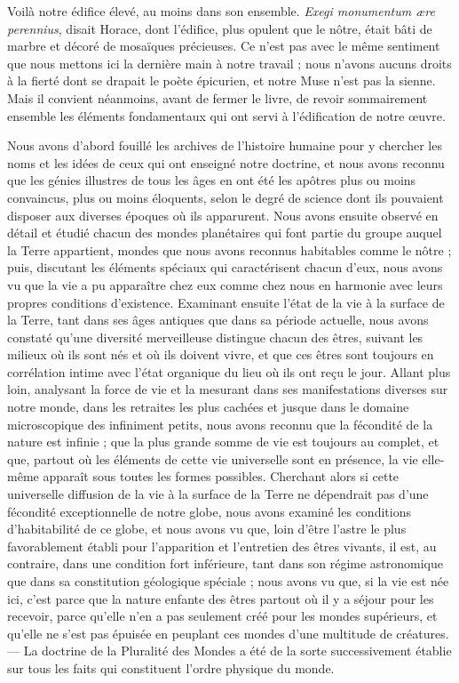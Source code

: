 \documentclass[a4paper, 11pt, oneside]{article}
\begin{document}
Voilà notre édifice élevé, au moins dans son ensemble. \emph{Exegi monumentum ære perennius}, disait Horace, dont l'édifice, plus opulent que le nôtre, était bâti de marbre et décoré de mosaïques précieuses. Ce n'est pas avec le même sentiment que nous mettons ici la dernière main à notre travail ; nous n'avons aucuns droits à la fierté dont se drapait le poète épicurien, et notre Muse n'est pas la sienne. Mais il convient néanmoins, avant de fermer le livre, de revoir sommairement ensemble les éléments fondamentaux qui ont servi à l'édification de notre œuvre.

Nous avons d'abord fouillé les archives de l'histoire humaine pour y chercher les noms et les idées de ceux qui ont enseigné notre doctrine, et nous avons reconnu que les génies illustres de tous les âges en ont été les apôtres plus ou moins convaincus, plus ou moins éloquents, selon le degré de science dont ils pouvaient disposer aux diverses époques où ils apparurent. Nous avons ensuite observé en détail et étudié chacun des mondes planétaires qui font partie du groupe auquel la Terre appartient, mondes que nous avons reconnus habitables comme le nôtre ; puis, discutant les éléments spéciaux qui caractérisent chacun d'eux, nous avons vu que la vie a pu apparaître chez eux comme chez nous en harmonie avec leurs propres conditions d'existence. Examinant ensuite l'état de la vie à la surface de la Terre, tant dans ses âges antiques que dans sa période actuelle, nous avons constaté qu'une diversité merveilleuse distingue chacun des êtres, suivant les milieux où ils sont nés et où ils doivent vivre, et que ces êtres sont toujours en corrélation intime avec l'état organique du lieu où ils ont reçu le jour. Allant plus loin, analysant la force de vie et la mesurant dans ses manifestations diverses sur notre monde, dans les retraites les plus cachées et jusque dans le domaine microscopique des infiniment petits, nous avons reconnu que la fécondité de la nature est infinie ; que la plus grande somme de vie est toujours au complet, et que, partout où les éléments de cette vie universelle sont en présence, la vie elle-même apparaît sous toutes les formes possibles. Cherchant alors si cette universelle diffusion de la vie à la surface de la Terre ne dépendrait pas d'une fécondité exceptionnelle de notre globe, nous avons examiné les conditions d'habitabilité de ce globe, et nous avons vu que, loin d'être l'astre le plus favorablement établi pour l'apparition et l'entretien des êtres vivants, il est, au contraire, dans une condition fort inférieure, tant dans son régime astronomique que dans sa constitution géologique spéciale ; nous avons vu que, si la vie est née ici, c'est parce que la nature enfante des êtres partout où il y a séjour pour les recevoir, parce qu'elle n'en a pas seulement créé pour les mondes supérieurs, et qu'elle ne s'est pas épuisée en peuplant ces mondes d'une multitude de créatures. --- La doctrine de la Pluralité des Mondes a été de la sorte successivement établie sur tous les faits qui constituent l'ordre physique du monde.
\end{document}
